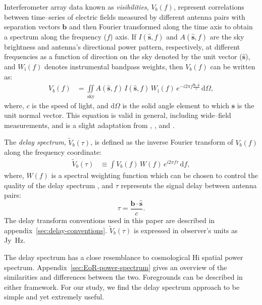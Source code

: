 \documentclass[preprint2,iop,numberedappendix,twocolappendix,appendixfloats]{emulateapj}
\newcommand{\dif}{\mathrm{d}}
\begin{document}
Interferometer array data known as {\it visibilities}, $V_b(f)$, represent correlations between time--series of electric fields measured by different antenna pairs with separation vectors $\boldsymbol{b}$ and then Fourier transformed along the time axis to obtain a spectrum along the frequency ($f$) axis. If $I(\hat{\boldsymbol{s}},f)$ and $A(\hat{\boldsymbol{s}},f)$ are the sky brightness and antenna's directional power pattern, respectively, at different frequencies as a function of direction on the sky denoted by the unit vector ($\hat{\boldsymbol{s}}$), and $W_\textrm{i}(f)$ denotes instrumental bandpass weights, then $V_b(f)$ can be written as:
\begin{align}\label{eqn:obsvis}
  V_b(f) &= \iint\limits_\textrm{sky} A(\hat{\boldsymbol{s}},f)\,I(\hat{\boldsymbol{s}},f)\,W_\textrm{i}(f)\,e^{-i2\pi f\frac{\boldsymbol{b}\cdot\hat{\boldsymbol{s}}}{c}}\,\dif\Omega,
\end{align}
where, $c$ is the speed of light, and $\dif\Omega$ is the solid angle element to which $\hat{\boldsymbol{s}}$ is the unit normal vector. This equation is valid in general, including wide--field measurements, and is a slight adaptation from \citet{van34}, \citet{zer38}, and \citet{tho01}.

The {\it delay spectrum}, $\tilde{V}_b(\tau)$, is defined as the inverse Fourier transform of $V_b(f)$ along the frequency coordinate:
\begin{align}\label{eqn:delay-transform}
  \tilde{V}_b(\tau) &\equiv \int V_b(f)\,W(f)\,e^{i2\pi f\tau}\,\dif f,
\end{align}
where, $W(f)$ is a spectral weighting function which can be chosen to control the quality of the delay spectrum \citep{thy13,ved12}, and $\tau$ represents the signal delay between antenna pairs:
\begin{equation}\label{eqn:delay}
  \tau = \frac{\boldsymbol{b}\cdot\hat{\boldsymbol{s}}}{c}.
\end{equation}
The delay transform conventions used in this paper are described in appendix~\ref{sec:delay-conventions}. $\tilde{V}_b(\tau)$ is expressed in observer's units as Jy~Hz. 

The delay spectrum has a close resemblance to cosmological H{\sc i} spatial power spectrum. Appendix~\ref{sec:EoR-power-spectrum} gives an overview of the similarities and differences between the two. Foregrounds can be described in either framework. For our study, we find the delay spectrum approach to be simple and yet extremely useful. 
\end{document}
